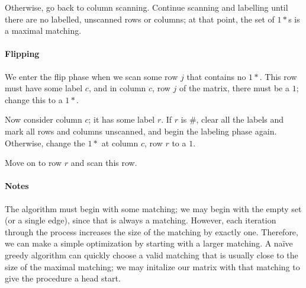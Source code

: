 \documentclass[12pt]{article}
\begin{document}
Otherwise, go back to column scanning.  Continue scanning and labelling until there are no labelled, unscanned rows or columns; at that point, the set of $1*$s is a maximal matching.

\paragraph{Flipping}

We enter the flip phase when we scan some row $j$ that contains no $1*$.  This row must have some label $c$, and in column $c$, row $j$ of the matrix, there must be a $1$; change this to a $1*$.

Now consider column $c$; it has some label $r$.  If $r$ is $\#$, clear all the labels and mark all rows and columns unscanned, and begin the labeling phase again.  Otherwise, change the $1*$ at column $c$, row $r$ to a $1$.

Move on to row $r$ and scan this row.

\paragraph{Notes}

The algorithm must begin with some matching; we may begin with the empty set (or a single edge), since that is always a matching.  However, each iteration through the process increases the size of the matching by exactly one.  Therefore, we can make a simple optimization by starting with a larger matching.  A na\"ive greedy algorithm can quickly choose a valid matching that is usually close to the size of the maximal matching; we may initalize our matrix with that matching to give the procedure a head start.
\end{document}
